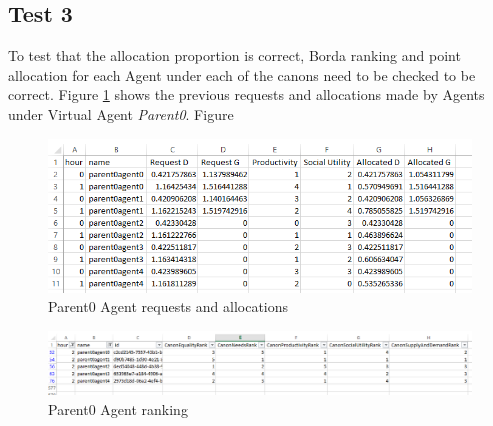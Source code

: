 \subsection*{Test 3}
To test that the allocation proportion is correct, Borda ranking and point allocation for each Agent under each of the canons need to be checked to be correct. Figure \ref{fig:test4} shows the previous requests and allocations made by Agents under Virtual Agent \textit{Parent0}. Figure 

\begin{figure}[h!]
 	\centering
 	\includegraphics[scale=0.4]{Images/test-allocation3(PrevData).png}
 	\caption{Parent0 Agent requests and allocations}
 	\label{fig:test4}
 \end{figure} 

 \begin{figure}[h!]
 	\centering
 	\includegraphics[scale=0.4]{Images/test-allocation3(Ranking).png}
 	\caption{Parent0 Agent ranking}
 	\label{fig:figure1}
 \end{figure}


